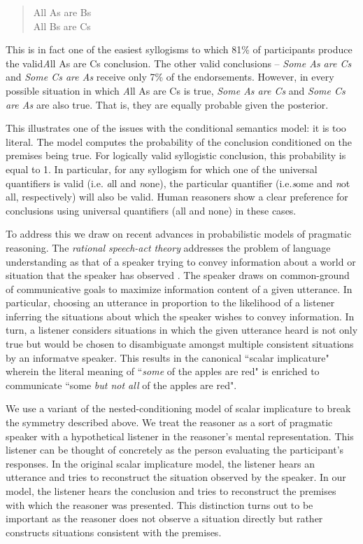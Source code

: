 \documentclass[10pt,letterpaper]{article}
\begin{document}
\begin{quotation}
All As are Bs \\
All Bs are Cs \\
\end{quotation}

This is in fact one of the easiest syllogisms to which 81\% of participants produce the valid{\emph All As are Cs} conclusion. The other valid conclusions -- \emph{Some As are Cs} and \emph{Some Cs are As} receive only 7\% of the endorsements. However, in every possible situation in which {\emph All As are Cs} is true, \emph{Some As are Cs} and \emph{Some Cs are As} are also true. That is, they are equally probable given the posterior. 

This illustrates one of the issues with the conditional semantics model: it is too literal. The model computes the probability of the conclusion conditioned on the premises being true. For logically valid syllogistic conclusion, this probability is equal to 1. In particular, for any syllogism for which one of the universal quantifiers is valid (i.e. {\emph all} and {\emph none}), the particular quantifier (i.e.{\emph some} and {\emph not all}, respectively) will also be valid. Human reasoners show a clear preference for conclusions using universal quantifiers (all and none) in these cases. 

To address this we draw on recent advances in probabilistic models of pragmatic reasoning. The \emph{rational speech-act theory} addresses the problem of language understanding as that of a speaker trying to convey information about a world or situation that the speaker has observed \cite{Frank2012a}. The speaker draws on common-ground of communicative goals to maximize information content of a given utterance. In particular, choosing an utterance in proportion to the likelihood of a listener inferring the situations about which the speaker wishes to convey information. In turn, a listener considers situations in which the given utterance heard is not only true but would be chosen to disambiguate amongst multiple consistent situations by an informatve speaker. This results in the canonical ``scalar implicature" wherein the literal meaning of ``{\em some} of the apples are red" is enriched to communicate ``some {\em but not all} of the apples are red".

We use a variant of the nested-conditioning model of scalar implicature \cite{Goodman2013} to break the symmetry described above. We treat the reasoner as a sort of pragmatic speaker with a hypothetical listener in the reasoner's mental representation. This listener can be thought of concretely as the person evaluating the participant's responses. In the original scalar implicature model, the listener hears an utterance and tries to reconstruct the situation observed by the speaker. In our model, the listener hears the conclusion and tries to reconstruct the premises with which the reasoner was presented. This distinction turns out to be important as the reasoner does not observe a situation directly but rather constructs situations consistent with the premises. 
\end{document}
